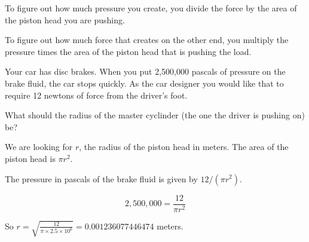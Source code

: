 To figure out how much pressure you create, you divide the force by
the area of the piston head you are pushing.

To figure out how much force that creates on the other end, you
multiply the pressure times the area of the piston head that is
pushing the load.

\begin{Exercise}[title={Hydraulics}, label=hydraulics]

Your car has disc brakes. When you put 2,500,000 pascals of pressure on the
brake fluid, the car stops quickly. As the car designer you would like
that to require 12 newtons of force from the driver's foot.

What should the radius of the master cyclinder (the one the driver is pushing on) be?
\end{Exercise}
\begin{Answer}[ref=hydraulics]
  We are looking for $r$, the radius of the piston head in meters. The area of the piston head is $\pi r^2$.

  The pressure in pascals of the brake fluid is given by $12 / (\pi r^2)$.

  $$2,500,000 = \frac{12}{\pi r^2}$$

  So $r = \sqrt{\frac{12}{\pi \times 2.5 \times 10^6}} = 0.001236077446474$ meters.

\end{Answer}
